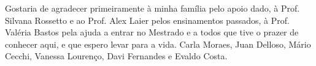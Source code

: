 \begin{agradecimentos}
Gostaria de agradecer primeiramente à minha família pelo apoio dado, à Prof.
Silvana Rossetto e ao Prof. Alex Laier pelos ensinamentos passados, à Prof.
Valéria Bastos pela ajuda a entrar no Mestrado e a todos que tive o prazer de conhecer aqui, e
que espero levar para a vida. Carla Moraes, Juan Delloso, Mário
Cecchi, Vanessa Lourenço, Davi Fernandes e Evaldo Costa.
\end{agradecimentos}
